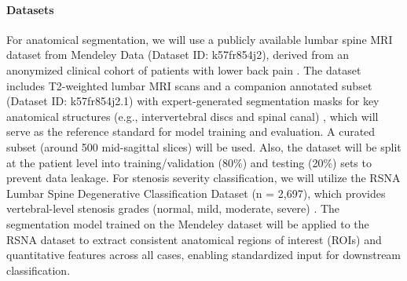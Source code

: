 \documentclass[12pt]{article}
\begin{document}
\paragraph{Datasets}
For anatomical segmentation, we will use a publicly available lumbar spine MRI dataset from Mendeley Data (Dataset ID: k57fr854j2), derived from an anonymized clinical cohort of patients with lower back pain \citep{lumbardataset}. The dataset includes T2-weighted lumbar MRI scans and a companion annotated subset (Dataset ID: k57fr854j2.1) with expert-generated segmentation masks for key anatomical structures (e.g., intervertebral discs and spinal canal) \citep{labelImg}, which will serve as the reference standard for model training and evaluation. A curated subset (around 500 mid-sagittal slices) will be used. Also, the dataset will be split at the patient level into training/validation (80\%) and testing (20\%) sets to prevent data leakage. For stenosis severity classification, we will utilize the RSNA Lumbar Spine Degenerative Classification Dataset (n = 2,697), which provides vertebral-level stenosis grades (normal, mild, moderate, severe) \citep{Richards2026}. The segmentation model trained on the Mendeley dataset will be applied to the RSNA dataset to extract consistent anatomical regions of interest (ROIs) and quantitative features across all cases, enabling standardized input for downstream classification.
\end{document}
